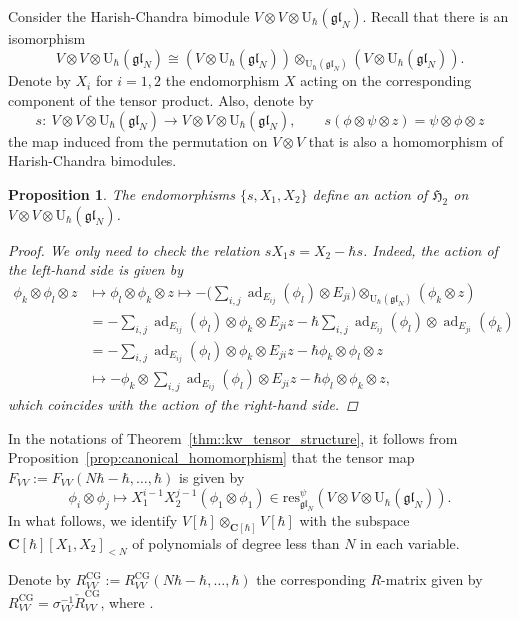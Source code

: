 \documentclass[10pt,a4paper]{amsart}
\numberwithin{equation}{section}
\newtheorem{Proposition}[Theorem]{Proposition}
{ \theoremstyle{definition}
	\newtheorem{Definition}[Theorem]{Definition}
	\newtheorem{Note}[Theorem]{Note}
	\newtheorem{Example}[Theorem]{Example}
	\newtheorem{Remark}[Theorem]{Remark} }
\newcommand{\CG}{\mathrm{CG}}
\newcommand{\C}{\mathbf{C}}
\newcommand{\U}{\mathrm{U}_{\hbar}}
\DeclareMathOperator{\ad}{ad}
\newcommand{\res}{\mathrm{res}}
\newcommand{\gl}{\mathfrak{gl}}
\begin{document}
	Consider the Harish-Chandra bimodule $V \otimes V \otimes \U(\gl_N)$. Recall that there is an isomorphism
	\[
	V \otimes V \otimes \U(\gl_N) \cong (V \otimes \U(\gl_N)) \otimes_{\U(\gl_N)} (V \otimes \U(\gl_N)).
	\]
	Denote by $X_i$ for $i=1,2$ the endomorphism $X$ acting on the corresponding component of the tensor product. Also, denote by
	\[
	s \colon\ V \otimes V \otimes \U(\gl_N) \rightarrow V \otimes V \otimes \U(\gl_N), \qquad s(\phi \otimes \psi \otimes z) = \psi \otimes \phi \otimes z
	\]
	the map induced from the permutation on $V \otimes V$ that is also a homomorphism of Harish-Chandra bimodules.
	
	\begin{Proposition}
		The endomorphisms $\{s,X_1,X_2\}$ define an action of $\mathfrak{H}_2$ on $V \otimes V \otimes \U(\gl_N)$.
		\begin{proof}
			We only need to check the relation $s X_1 s = X_2 - \hbar s$. Indeed, the action of the left-hand side is given by
			\begin{align*}
				\phi_k \otimes \phi_l \otimes z &\mapsto \phi_l \otimes \phi_k \otimes z \mapsto -\bigg(\sum_{i,j} \ad_{E_{ij}}(\phi_l) \otimes E_{ji}\bigg) \otimes_{\U(\gl_N)} (\phi_k \otimes z) \\
				& = -\sum_{i,j} \ad_{E_{ij}}(\phi_l) \otimes \phi_k \otimes E_{ji}z - \hbar \sum_{i,j} \ad_{E_{ij}} (\phi_l) \otimes \ad_{E_{ji}} (\phi_k) \\
				&= -\sum_{i,j} \ad_{E_{ij}}(\phi_l) \otimes \phi_k \otimes E_{ji}z - \hbar \phi_k \otimes \phi_l \otimes z \\
				&\mapsto - \phi_k\otimes \sum_{i,j} \ad_{E_{ij}}(\phi_l) \otimes E_{ji}z - \hbar \phi_l \otimes \phi_k \otimes z,
			\end{align*}
			which coincides with the action of the right-hand side.
		\end{proof}
	\end{Proposition}
	
	In the notations of Theorem~\ref{thm::kw_tensor_structure}, it follows from Proposition~\ref{prop:canonical_homomorphism} that the tensor map $F_{VV}:=F_{VV}(N\hbar-\hbar,\dots,\hbar)$ is given by
	\[
	\phi_i \otimes \phi_j \mapsto X_1^{i-1} X_2^{j-1}(\phi_1 \otimes \phi_1)\in \res^{\psi}_{\gl_N}(V \otimes V \otimes \U(\gl_N)).
	\]
	In what follows, we identify $V[\hbar] \otimes_{\C[\hbar]} V[\hbar]$ with the subspace $\C[\hbar][X_1,X_2]_{<N}$ of polynomials of degree less than $N$ in each variable.
	
	Denote by $R^{\CG}_{VV}:= R^{\CG}_{VV}(N\hbar-\hbar,\dots,\hbar)$ the corresponding $R$-matrix given by $R^{\CG}_{VV}\! =\! \sigma_{VV}^{-1} \check{R}^{\CG}_{VV}$, where \smash{$\check{R}^{\CG}_{VV} = F_{VV}^{-1} \sigma_{VV} F_{VV}$}.
	
\end{document}
